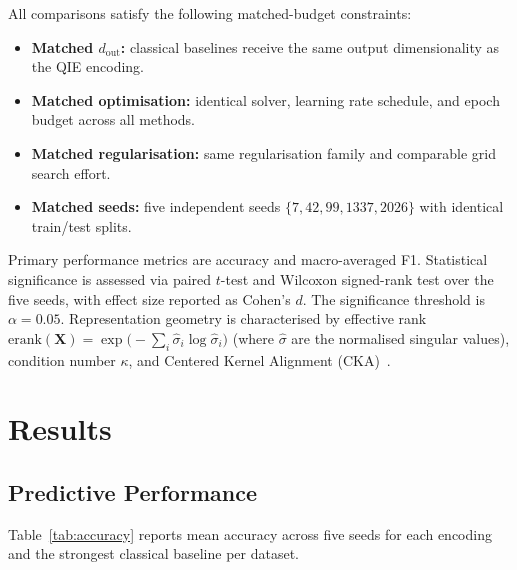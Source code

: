 \documentclass[12pt]{article}
\newcommand{\erank}{\mathrm{erank}}
\newcommand{\dout}{d_{\mathrm{out}}}
\begin{document}
All comparisons satisfy the following matched-budget constraints:
\begin{itemize}
  \item \textbf{Matched $\dout$:} classical baselines receive the same output
        dimensionality as the QIE encoding.
  \item \textbf{Matched optimisation:} identical solver, learning rate
        schedule, and epoch budget across all methods.
  \item \textbf{Matched regularisation:} same regularisation family and
        comparable grid search effort.
  \item \textbf{Matched seeds:} five independent seeds
        $\{7, 42, 99, 1337, 2026\}$ with identical train/test splits.
\end{itemize}

Primary performance metrics are accuracy and macro-averaged F1.
Statistical significance is assessed via paired $t$-test and Wilcoxon
signed-rank test over the five seeds, with effect size reported as Cohen's $d$.
The significance threshold is $\alpha = 0.05$.
Representation geometry is characterised by effective rank
$\erank(\mathbf{X}) = \exp\!\bigl(-\sum_i \hat{\sigma}_i \log \hat{\sigma}_i\bigr)$
(where $\hat{\sigma}$ are the normalised singular values), condition number
$\kappa$, and Centered Kernel Alignment (CKA)~\citep{kornblith2019}.

\section{Results}
\label{sec:results}

\subsection{Predictive Performance}
\label{sec:perf}

Table~\ref{tab:accuracy} reports mean accuracy across five seeds for each
encoding and the strongest classical baseline per dataset.
\end{document}
